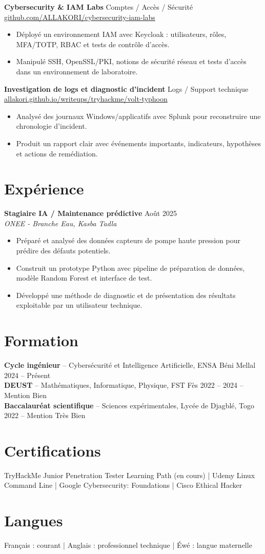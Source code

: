 \documentclass[10pt,a4paper]{article}
\newcommand{\role}[3]{%
  \textbf{#1} \hfill #3\\
  \textit{#2}\vspace{1pt}
}
\newcommand{\edu}[4]{%
  \textbf{#1} -- #2 \hfill #3 #4\\[5pt]
}
\begin{document}
\textbf{Cybersecurity \& IAM Labs} \hfill Comptes / Accès / Sécurité\\
\href{https://github.com/ALLAKORI/cybersecurity-iam-labs}{github.com/ALLAKORI/cybersecurity-iam-labs}
\begin{itemize}
  \item Déployé un environnement IAM avec Keycloak : utilisateurs, rôles, MFA/TOTP, RBAC et tests de contrôle d'accès.
  \item Manipulé SSH, OpenSSL/PKI, notions de sécurité réseau et tests d'accès dans un environnement de laboratoire.
\end{itemize}

\textbf{Investigation de logs et diagnostic d'incident} \hfill Logs / Support technique\\
\href{https://allakori.github.io/writeups/posts/volt-typhoon-intrusion/}{allakori.github.io/writeups/tryhackme/volt-typhoon}
\begin{itemize}
  \item Analysé des journaux Windows/applicatifs avec Splunk pour reconstruire une chronologie d'incident.
  \item Produit un rapport clair avec événements importants, indicateurs, hypothèses et actions de remédiation.
\end{itemize}

\section{Expérience}
\role{Stagiaire IA / Maintenance prédictive}{ONEE - Branche Eau, Kasba Tadla}{Août 2025}
\begin{itemize}
  \item Préparé et analysé des données capteurs de pompe haute pression pour prédire des défauts potentiels.
  \item Construit un prototype Python avec pipeline de préparation de données, modèle Random Forest et interface de test.
  \item Développé une méthode de diagnostic et de présentation des résultats exploitable par un utilisateur technique.
\end{itemize}

\section{Formation}
\edu{Cycle ingénieur}{Cybersécurité et Intelligence Artificielle, ENSA Béni Mellal}{2024 -- Présent}{}
\edu{DEUST}{Mathématiques, Informatique, Physique, FST Fès}{2022 -- 2024}{-- Mention Bien}
\edu{Baccalauréat scientifique}{Sciences expérimentales, Lycée de Djagblé, Togo}{2022}{-- Mention Très Bien}

\section{Certifications}
TryHackMe Junior Penetration Tester Learning Path (en cours) | Udemy Linux Command Line | Google Cybersecurity: Foundations | Cisco Ethical Hacker

\section{Langues}
Français : courant | Anglais : professionnel technique | Éwé : langue maternelle
\end{document}
